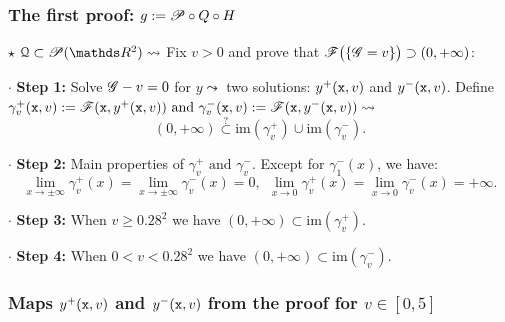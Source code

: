 \documentclass{beamer}
\begin{document}
\begin{frame}
\frametitle{The first proof: $g:=\P\circ Q\circ H$}
$\star$ $\Qu \subset \P(\R^2) \leadsto$ Fix $v>0$ and prove that $\F\big(\{\G=v\}\big) \supset(0,+\infty)$: 
\vspace{0.4cm}

$\cdot $ \textbf{Step 1:}  Solve $\G-v=0$ for $y \leadsto$ two solutions: $y^+(\x, v)$ and $y^-(\x, v)$. Define $\gamma_v^+(\x, v):=\F(\x,y^+(\x,v))\text{ and }\gamma_v^-(\x, v):=\F(\x,y^-(\x,v)) \leadsto$ \vspace{-0.1cm}
$$
(0,+\infty)\overset{?}{\subset}\text{im}(\gamma_v^+)\cup\text{im}(\gamma_v^-).
$$ 
\vspace{-0.4cm}

$\cdot $ \textbf{Step 2:}  Main properties of $\gamma_v^+ \text{ and } \gamma_v^-$. Except for $\gamma_1^-(x)$, we have: \vspace{-0.1cm}
$$
\lim_{x\rightarrow \pm\infty}\gamma_v^+(x)=\lim_{x\rightarrow \pm\infty}\gamma_v^-(x)=0,\ \ \lim_{x\rightarrow 0}\gamma_v^+(x)=\lim_{x\rightarrow 0}\gamma_v^-(x) = +\infty.
$$ 
\vspace{-0.3cm}

$\cdot $ \textbf{Step 3:} When $v\geq 0.28^2$ we have $(0,+\infty)\subset\text{im}(\gamma_v^+)$.  
\vspace{0.4cm}

$\cdot $ \textbf{Step 4:} When $0<v<0.28^2$ we have $(0,+\infty)\subset\text{im}(\gamma_v^-)$.

\end{frame}

\begin{frame}
\frametitle{Maps $y^+(\x,v)$ and $y^-(\x,v)$ from the proof for $v\in[0,5]$}
\vspace{-0.3cm}
\begin{center}
\begin{animateinline}[autoplay,totalheight=8cm,loop]{12}
	\newframe*
\end{animateinline}
\end{center}
\end{frame}
\end{document}
